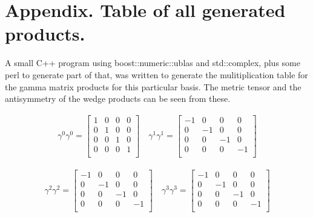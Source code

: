 \documentclass{article}
\begin{document}
\section{ Appendix.  Table of all generated products. }

A small C++ program using boost::numeric::ublas and std::complex,
plus some perl to generate part of that, was
written to generate the mulitiplication table for the gamma matrix products
for this particular basis.  The metric tensor and the antisymmetry of
the wedge products can be seen from these.





\begin{align*}
\gamma^0 \gamma^0 = \begin{bmatrix}
 1  &  0  &  0  &  0  \\
 0  &  1  &  0  &  0  \\
 0  &  0  &  1  &  0  \\
 0  &  0  &  0  &  1  \\
\end{bmatrix} \quad
\gamma^1 \gamma^1 = \begin{bmatrix}
 -1  &  0  &  0  &  0  \\
 0  &  -1  &  0  &  0  \\
 0  &  0  &  -1  &  0  \\
 0  &  0  &  0  &  -1  \\
\end{bmatrix}
\end{align*}

\begin{align*}
\gamma^2 \gamma^2 = \begin{bmatrix}
 -1  &  0  &  0  &  0  \\
 0  &  -1  &  0  &  0  \\
 0  &  0  &  -1  &  0  \\
 0  &  0  &  0  &  -1  \\
\end{bmatrix} \quad
\gamma^3 \gamma^3 = \begin{bmatrix}
 -1  &  0  &  0  &  0  \\
 0  &  -1  &  0  &  0  \\
 0  &  0  &  -1  &  0  \\
 0  &  0  &  0  &  -1  \\
\end{bmatrix}
\end{align*}
\end{document}
